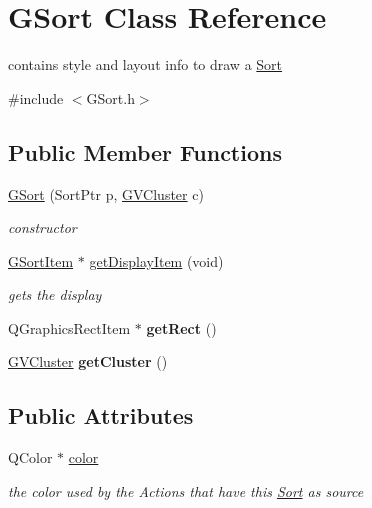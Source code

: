\hypertarget{class_g_sort}{\section{\-G\-Sort \-Class \-Reference}
\label{class_g_sort}
}


contains style and layout info to draw a \hyperlink{class_sort}{\-Sort}  




{\ttfamily \#include $<$\-G\-Sort.\-h$>$}

\subsection*{\-Public \-Member \-Functions}
\begin{DoxyCompactItemize}
\item 
\hyperlink{class_g_sort_a423709cc4cc15bc05219b08e1276f455}{\-G\-Sort} (\-Sort\-Ptr p, \hyperlink{struct_g_v_cluster}{\-G\-V\-Cluster} c)
\begin{DoxyCompactList}\small\item\em constructor \end{DoxyCompactList}\item 
\hyperlink{class_g_sort_item}{\-G\-Sort\-Item} $\ast$ \hyperlink{class_g_sort_a1b930cc66df1898109e8ca82788b93c0}{get\-Display\-Item} (void)
\begin{DoxyCompactList}\small\item\em gets the display \end{DoxyCompactList}\item 
\hypertarget{class_g_sort_a62b1a8ada691f61cb100568bf25f78d6}{\-Q\-Graphics\-Rect\-Item $\ast$ {\bfseries get\-Rect} ()}\label{class_g_sort_a62b1a8ada691f61cb100568bf25f78d6}

\item 
\hypertarget{class_g_sort_ad843ded0ec50cef488015b82661991ed}{\hyperlink{struct_g_v_cluster}{\-G\-V\-Cluster} {\bfseries get\-Cluster} ()}\label{class_g_sort_ad843ded0ec50cef488015b82661991ed}

\end{DoxyCompactItemize}
\subsection*{\-Public \-Attributes}
\begin{DoxyCompactItemize}
\item 
\hypertarget{class_g_sort_afdedfe6a6028c586a755315351eee309}{\-Q\-Color $\ast$ \hyperlink{class_g_sort_afdedfe6a6028c586a755315351eee309}{color}}\label{class_g_sort_afdedfe6a6028c586a755315351eee309}

\begin{DoxyCompactList}\small\item\em the color used by the \-Actions that have this \hyperlink{class_sort}{\-Sort} as source \end{DoxyCompactList}\end{DoxyCompactItemize}
